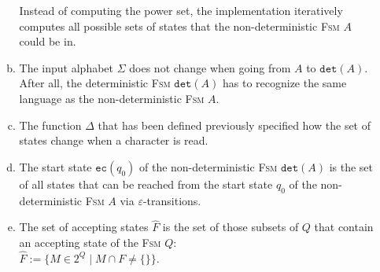 \begin{enumerate}
\begin{enumerate}[(a)]
            Instead of computing the power set, the implementation iteratively computes all possible sets of
            states that the non-deterministic \textsc{Fsm} $A$ could be in.
      \item The input alphabet $\Sigma$ does not change when going from $A$ to $\texttt{det}(A)$.
            After all, the deterministic \textsc{Fsm} $\texttt{det}(A)$ has to recognize the same language as
            the non-deterministic \textsc{Fsm} $A$.
     \item The function $\Delta$ that has been defined previously specified how the set of states change when a
           character is read. 
     \item The start state $\texttt{ec}(q_0)$ of the non-deterministic \textsc{Fsm} $\texttt{det}(A)$ is the
           set of all states 
           that can be reached from the start state $q_0$ of the non-deterministic \textsc{Fsm} $A$
           via $\varepsilon$-transitions.
     \item The set of accepting states $\widehat{F}$ is the set of those subsets of $Q$ that contain an accepting
           state of the \textsc{Fsm}  $Q$:
           \\[-0.1cm]
           \hspace*{1.3cm}
           $\widehat{F} := \bigl\{ M \in 2^Q \mid M \cap F \not= \{\} \bigl\}$.
     \end{enumerate}
\end{enumerate}

